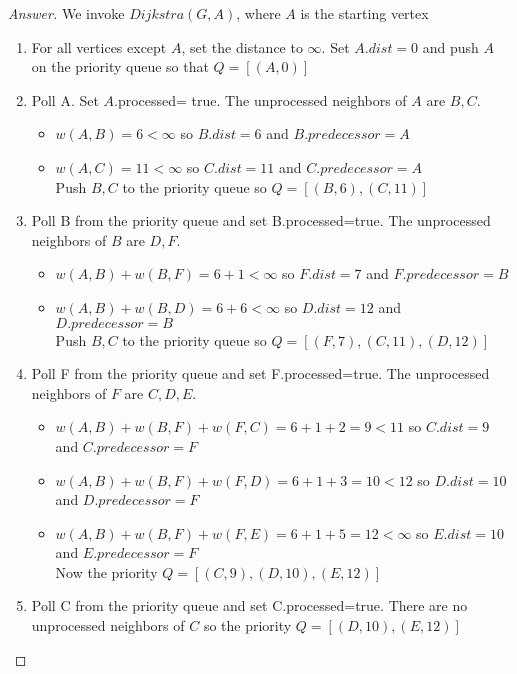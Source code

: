 \documentclass[11pt]{article}
\theoremstyle{definition}
\theoremstyle{definition}
\theoremstyle{definition}
\begin{document}
\begin{proof}[Answer]


We invoke $Dijkstra(G, A)$, where $A$ is the starting vertex \\

\begin{enumerate}
\item For all vertices except $A$, set the distance to $\infty$. Set $A.dist= 0$ and push $A$ on the priority queue so that $Q= [(A,0)]$
\item Poll A. Set $A$.processed= true. The unprocessed neighbors of $A$ are $B,C$. 
	\begin{itemize}
	\item $w({A,B})= 6 < \infty$ so $B.dist=6$ and $B.predecessor= A$
	\item $w({A,C})= 11 < \infty$ so $C.dist=11$ and $C.predecessor= A$\\
	Push $B,C$ to the priority queue so $Q= [(B,6), (C,11)]$
	\end{itemize}
\item Poll B from the priority queue and set B.processed=true. The unprocessed neighbors of $B$ are $D, F$.
\begin{itemize}
	\item $w({A,B}) + w({B,F}) = 6+1 < \infty$ so $F.dist=7$ and $F.predecessor= B$
	\item $w({A,B}) + w({B,D}) = 6+6 < \infty$ so $D.dist=12$ and $D.predecessor= B$\\
	Push $B,C$ to the priority queue so $Q= [(F,7), (C,11), (D,12)]$
	\end{itemize}
\item Poll F from the priority queue and set F.processed=true. The unprocessed neighbors of $F$ are $C, D,E$.
	\begin{itemize}
	\item $w({A,B}) + w({B,F}) + w({F,C}) = 6+1+2 = 9< 11$ so $C.dist=9$ and $C.predecessor= F$\\
	\item $w({A,B}) + w({B,F}) + w({F,D}) = 6+1+3 = 10< 12$ so $D.dist=10$ and $D.predecessor= F$\\
	\item $w({A,B}) + w({B,F}) + w({F,E}) = 6+1+5 = 12< \infty$ so $E.dist=10$ and $E.predecessor= F$\\
	Now the priority $Q= [(C,9), (D,10), (E,12)]$
	\end{itemize}
\item Poll C from the priority queue and set C.processed=true. There are no unprocessed neighbors of $C$ so the priority $Q= [(D,10), (E,12)]$
	

\end{enumerate}
\end{proof}
\end{document}
